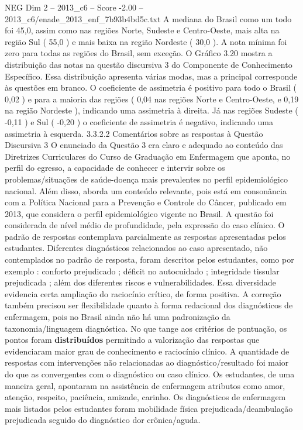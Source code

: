 \begin{textsample}{NEG Dim 2 – 2013\_c6 – Score -2.00 – 2013\_c6/enade\_2013\_enf\_7b93b4bd5c.txt}
A mediana do Brasil como um todo foi 45,0, assim como nas regiões Norte, Sudeste e Centro-Oeste, mais alta na região Sul ( 55,0 ) e mais baixa na região Nordeste ( 30,0 ).
A nota mínima foi zero para todas as regiões do Brasil, sem exceção.
O Gráfico 3.20 mostra a distribuição das notas na questão discursiva 3 do Componente de Conhecimento Específico.
Essa distribuição apresenta várias modas, mas a principal corresponde às questões em branco.
O coeficiente de assimetria é positivo para todo o Brasil ( 0,02 ) e para a maioria das regiões ( 0,04 nas regiões Norte e Centro-Oeste, e 0,19 na região Nordeste ), indicando uma assimetria à direita.
Já nas regiões Sudeste ( -0,11 ) e Sul ( -0,20 ) o coeficiente de assimetria é negativo, indicando uma assimetria à esquerda. 3.3.2.2 Comentários sobre as respostas à Questão Discursiva 3 O enunciado da Questão 3 era claro e adequado ao conteúdo das Diretrizes Curriculares do Curso de Graduação em Enfermagem que aponta, no perfil do egresso, a capacidade de conhecer e intervir sobre os problemas/situações de saúde-doença mais prevalentes no perfil epidemiológico nacional.
Além disso, aborda um conteúdo relevante, pois está em consonância com a Política Nacional para a Prevenção e Controle do Câncer, publicado em 2013, que considera o perfil epidemiológico vigente no Brasil.
A questão foi considerada de nível médio de profundidade, pela expressão do caso clínico.
O padrão de respostas contemplava parcialmente as respostas apresentadas pelos estudantes.
Diferentes diagnósticos relacionados ao caso apresentado, não contemplados no padrão de resposta, foram descritos pelos estudantes, como por exemplo : conforto prejudicado ; déficit no autocuidado ; integridade tissular prejudicada ; além dos diferentes riscos e vulnerabilidades.
Essa diversidade evidencia certa ampliação do raciocínio crítico, de forma positiva.
A correção também precisou ser flexibilidade quanto à forma redacional dos diagnósticos de enfermagem, pois no Brasil ainda não há uma padronização da taxonomia/linguagem diagnóstica.
No que tange aos critérios de pontuação, os pontos foram \textbf{distribuídos} permitindo a valorização das respostas que evidenciaram maior grau de conhecimento e raciocínio clínico.
A quantidade de respostas com intervenções não relacionadas ao diagnóstico/resultado foi maior do que as convergentes com o diagnóstico ou caso clínico.
Os estudantes, de uma maneira geral, apontaram na assistência de enfermagem atributos como amor, atenção, respeito, paciência, amizade, carinho.
Os diagnósticos de enfermagem mais listados pelos estudantes foram mobilidade física prejudicada/deambulação prejudicada seguido do diagnóstico dor crônica/aguda.

\end{textsample}
